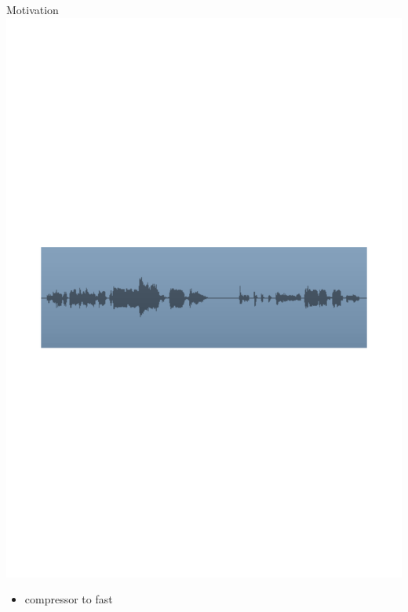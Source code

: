 \begin{frame}[c]{Motivation}{}
	\includegraphics[scale=0.6]{images/wave}
	\centering
	\\
	\begin{itemize}
		\item compressor to fast
	\end{itemize}
\end{frame}

